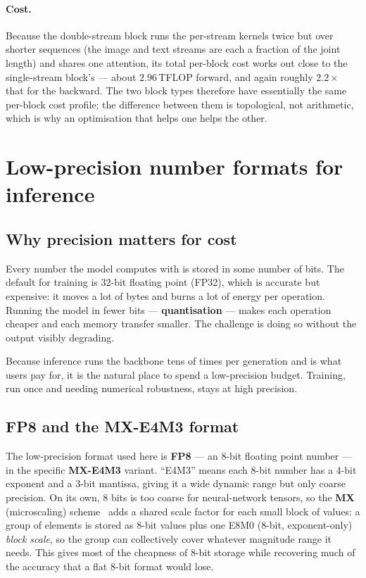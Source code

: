 \documentclass[11pt]{report}
\begin{document}
\paragraph{Cost.} Because the double-stream block runs the per-stream
kernels twice but over shorter sequences (the image and text streams are
each a fraction of the joint length) and shares one attention, its total
per-block cost works out close to the single-stream block's --- about
$2.96$\,TFLOP forward, and again roughly $2.2\times$ that for the backward.
The two block types therefore have essentially the same per-block cost
profile; the difference between them is topological, not arithmetic, which
is why an optimisation that helps one helps the other.

\section{Low-precision number formats for inference}
\label{sec:quant}

\subsection{Why precision matters for cost}

Every number the model computes with is stored in some number of bits. The
default for training is 32-bit floating point (FP32), which is accurate but
expensive: it moves a lot of bytes and burns a lot of energy per
operation. Running the model in fewer bits --- \textbf{quantisation} ---
makes each operation cheaper and each memory transfer smaller. The
challenge is doing so without the output visibly degrading.

Because inference runs the backbone tens of times per generation and is
what users pay for, it is the natural place to spend a low-precision
budget. Training, run once and needing numerical robustness, stays at high
precision.

\subsection{FP8 and the MX-E4M3 format}

The low-precision format used here is \textbf{FP8} --- an 8-bit floating
point number --- in the specific \textbf{MX-E4M3} variant. ``E4M3'' means
each 8-bit number has a 4-bit exponent and a 3-bit mantissa, giving it a
wide dynamic range but only coarse precision. On its own, 8 bits is too
coarse for neural-network tensors, so the \textbf{MX} (microscaling)
scheme~\cite{ocp2023mx} adds a shared scale factor for each small block of
values: a group of
elements is stored as 8-bit values plus one E8M0 (8-bit, exponent-only)
\emph{block scale}, so the group can collectively cover whatever magnitude
range it needs. This gives most of the cheapness of 8-bit storage while
recovering much of the accuracy that a flat 8-bit format would lose.
\end{document}
